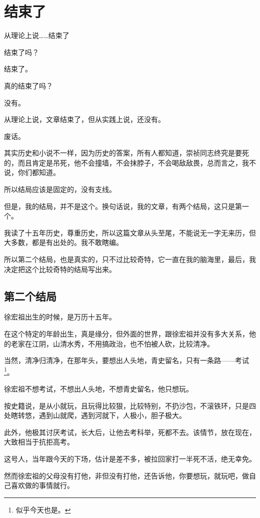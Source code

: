\section{结束了}
\ifnum{}
	\begin{multicols}{\theparacolNo}
		\fi
		从理论上说……结束了

		结束了吗？

		结束了。

		真的结束了吗？

		没有。

		从理论上说，文章结束了，但从实践上说，还没有。

		废话。

		其实历史和小说不一样，因为历史的答案，所有人都知道，崇祯同志终究是要死的，而且肯定是吊死，他不会撞墙，不会抹脖子，不会喝敌敌畏，总而言之，我不说，你们都知道。

		所以结局应该是固定的，没有支线。

		但是，我的结局，并不是这个。换句话说，我的文章，有两个结局，这只是第一个。

		我读了十五年历史，尊重历史，所以这篇文章从头至尾，不能说无一字无来历，但大多数，都是有出处的。我不敢瞎编。

		所以第二个结局，也是真实的，只不过比较奇特，它一直在我的脑海里，最后，我决定把这个比较奇特的结局写出来。

		\subsection{第二个结局}
		徐宏祖出生的时候，是万历十五年。

		在这个特定的年龄出生，真是缘分，但外面的世界，跟徐宏祖并没有多大关系，他的老家在江阴，山清水秀，不用搞政治，也不怕被人砍，比较清净。

		当然，清净归清净，在那年头，要想出人头地，青史留名，只有一条路——考试\footnote{似乎今天也是。}。

		徐宏祖不想考试，不想出人头地，不想青史留名，他只想玩。

		按史籍说，是从小就玩，且玩得比较狠，比较特别，不扔沙包，不滚铁环，只是四处瞎转悠，遇到山就爬，遇到河就下，人极小，胆子极大。

		此外，他极其讨厌考试，长大后，让他去考科举，死都不去。该情节，放在现在，大致相当于抗拒高考。

		这号人，当年跟今天的下场，估计是差不多，被拉回家打一半死不活，绝无幸免。

		然而徐宏祖的父母没有打他，非但没有打他，还告诉他，你要想玩，就玩吧，做自己喜欢做的事情就行。


\end{multicols}
